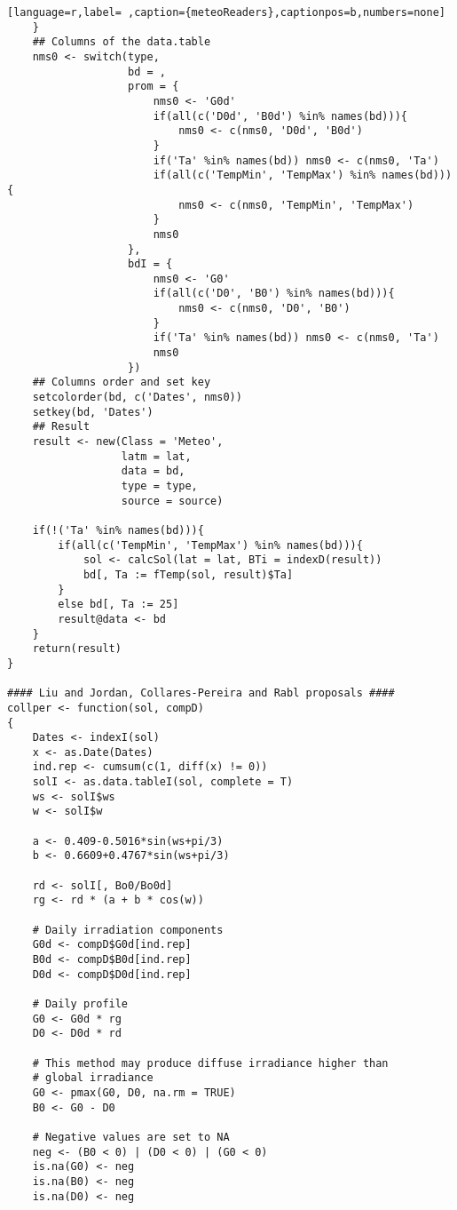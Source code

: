 \begin{lstlisting}[language=r,label= ,caption={meteoReaders},captionpos=b,numbers=none]
    }
    ## Columns of the data.table
    nms0 <- switch(type,
                   bd = ,
                   prom = {
                       nms0 <- 'G0d'
                       if(all(c('D0d', 'B0d') %in% names(bd))){
                           nms0 <- c(nms0, 'D0d', 'B0d')
                       }
                       if('Ta' %in% names(bd)) nms0 <- c(nms0, 'Ta')
                       if(all(c('TempMin', 'TempMax') %in% names(bd))){
                           nms0 <- c(nms0, 'TempMin', 'TempMax')
                       }
                       nms0
                   },
                   bdI = {
                       nms0 <- 'G0'
                       if(all(c('D0', 'B0') %in% names(bd))){
                           nms0 <- c(nms0, 'D0', 'B0')
                       }
                       if('Ta' %in% names(bd)) nms0 <- c(nms0, 'Ta')
                       nms0
                   })
    ## Columns order and set key
    setcolorder(bd, c('Dates', nms0))
    setkey(bd, 'Dates')
    ## Result
    result <- new(Class = 'Meteo',
                  latm = lat,
                  data = bd,
                  type = type,
                  source = source)

    if(!('Ta' %in% names(bd))){
        if(all(c('TempMin', 'TempMax') %in% names(bd))){
            sol <- calcSol(lat = lat, BTi = indexD(result))
            bd[, Ta := fTemp(sol, result)$Ta]
        }
        else bd[, Ta := 25]
        result@data <- bd
    }
    return(result)
}

#### Liu and Jordan, Collares-Pereira and Rabl proposals ####
collper <- function(sol, compD)
{
    Dates <- indexI(sol)
    x <- as.Date(Dates)
    ind.rep <- cumsum(c(1, diff(x) != 0))
    solI <- as.data.tableI(sol, complete = T)
    ws <- solI$ws
    w <- solI$w

    a <- 0.409-0.5016*sin(ws+pi/3)
    b <- 0.6609+0.4767*sin(ws+pi/3)

    rd <- solI[, Bo0/Bo0d]
    rg <- rd * (a + b * cos(w))

    # Daily irradiation components
    G0d <- compD$G0d[ind.rep]
    B0d <- compD$B0d[ind.rep]
    D0d <- compD$D0d[ind.rep]

    # Daily profile
    G0 <- G0d * rg
    D0 <- D0d * rd

    # This method may produce diffuse irradiance higher than
    # global irradiance
    G0 <- pmax(G0, D0, na.rm = TRUE)
    B0 <- G0 - D0

    # Negative values are set to NA
    neg <- (B0 < 0) | (D0 < 0) | (G0 < 0)
    is.na(G0) <- neg
    is.na(B0) <- neg
    is.na(D0) <- neg


\end{lstlisting}
